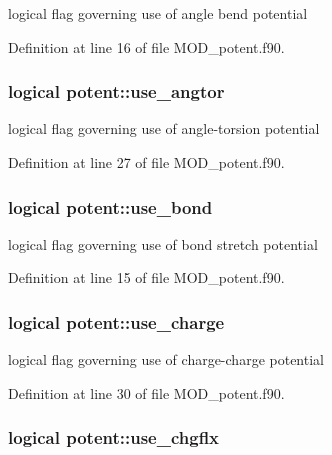 logical flag governing use of angle bend potential 



Definition at line 16 of file M\-O\-D\-\_\-potent.\-f90.

\hypertarget{classpotent_aaf54bf6c5c9dd0284fb25717484e92ee}{
\subsubsection[{use\-\_\-angtor}]{\setlength{\rightskip}{0pt plus 5cm}logical potent\-::use\-\_\-angtor}}\label{classpotent_aaf54bf6c5c9dd0284fb25717484e92ee}


logical flag governing use of angle-\/torsion potential 



Definition at line 27 of file M\-O\-D\-\_\-potent.\-f90.

\hypertarget{classpotent_a901c84bd1620b837b397b5a27333183f}{
\subsubsection[{use\-\_\-bond}]{\setlength{\rightskip}{0pt plus 5cm}logical potent\-::use\-\_\-bond}}\label{classpotent_a901c84bd1620b837b397b5a27333183f}


logical flag governing use of bond stretch potential 



Definition at line 15 of file M\-O\-D\-\_\-potent.\-f90.

\hypertarget{classpotent_a8f222bf9cf2bda7af98a4ea15d0cd6cf}{
\subsubsection[{use\-\_\-charge}]{\setlength{\rightskip}{0pt plus 5cm}logical potent\-::use\-\_\-charge}}\label{classpotent_a8f222bf9cf2bda7af98a4ea15d0cd6cf}


logical flag governing use of charge-\/charge potential 



Definition at line 30 of file M\-O\-D\-\_\-potent.\-f90.

\hypertarget{classpotent_affe1988d7557036700e8d5c8315e3431}{
\subsubsection[{use\-\_\-chgflx}]{\setlength{\rightskip}{0pt plus 5cm}logical potent\-::use\-\_\-chgflx}}\label{classpotent_affe1988d7557036700e8d5c8315e3431}



